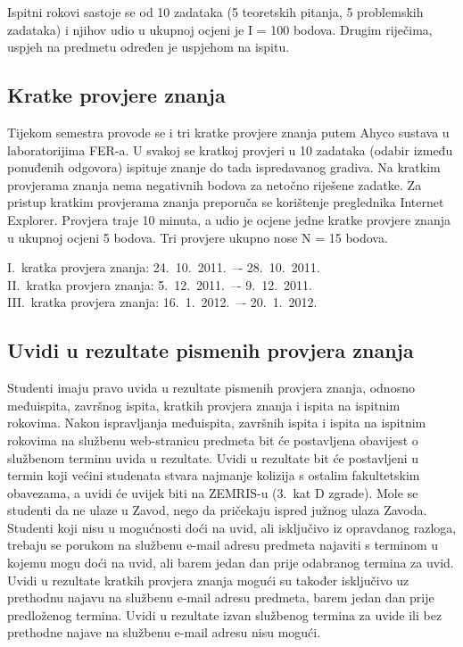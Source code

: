 \documentclass[times, 12pt, utf8]{book}
\begin{document}
Ispitni rokovi sastoje se od 10 zadataka (5 teoretskih pitanja, 5 problemskih zadataka) i njihov udio u ukupnoj ocjeni je I = 100 bodova.
Drugim riječima, uspjeh na predmetu određen je uspjehom na ispitu.

\cleardoublepage  
{}  
{}
\subsection*{Kratke provjere znanja}

Tijekom semestra provode se i tri kratke provjere znanja putem Ahyco sustava u laboratorijima FER-a.
U svakoj se kratkoj provjeri u 10 zadataka (odabir između ponuđenih odgovora) ispituje znanje do tada ispredavanog gradiva.
Na kratkim provjerama znanja nema negativnih bodova za netočno riješene zadatke.
Za pristup kratkim provjerama znanja preporuča se korištenje preglednika Internet Explorer.
Provjera traje 10 minuta, a udio je ocjene jedne kratke provjere znanja u ukupnoj ocjeni 5 bodova.
Tri provjere ukupno nose N = 15 bodova.

I.~kratka provjera znanja: 24.~10.~2011.~–- 28.~10.~2011. \\
II.~kratka provjera znanja: 5.~12.~2011.~–- 9.~12.~2011. \\
III.~kratka provjera znanja: 16.~1.~2012.~–- 20.~1.~2012.

\cleardoublepage  
{}  
{}
\subsection*{Uvidi u rezultate pismenih provjera znanja}

Studenti imaju pravo uvida u rezultate pismenih provjera znanja, odnosno međuispita, završnog ispita, kratkih provjera znanja i ispita na ispitnim rokovima.
Nakon ispravljanja međuispita, završnih ispita i ispita na ispitnim rokovima na službenu web-stranicu predmeta bit će postavljena obavijest o službenom terminu uvida u rezultate.
Uvidi u rezultate bit će postavljeni u termin koji većini studenata stvara najmanje kolizija s ostalim fakultetskim obavezama, a uvidi će uvijek biti na ZEMRIS-u (3.~kat D zgrade).
Mole se studenti da ne ulaze u Zavod, nego da pričekaju ispred južnog ulaza Zavoda.
Studenti koji nisu u mogućnosti doći na uvid, ali isključivo iz opravdanog razloga, trebaju se porukom na službenu e-mail adresu predmeta najaviti s terminom u kojemu mogu doći na uvid, ali barem jedan dan prije odabranog termina za uvid.
Uvidi u rezultate kratkih provjera znanja mogući su također isključivo uz prethodnu najavu na službenu e-mail adresu predmeta, barem jedan dan prije predloženog termina.
Uvidi u rezultate izvan službenog termina za uvide ili bez prethodne najave na službenu e-mail adresu nisu mogući.
\end{document}
